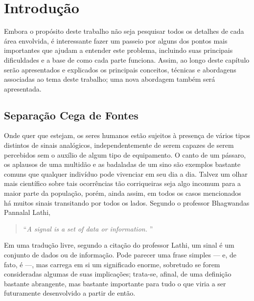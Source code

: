 \chapter{Introdução}
\label{cha:intro}

\setcounter{page}{1}



Embora o propósito deste trabalho não seja pesquisar todos os detalhes de cada área envolvida, é interessante fazer um passeio por alguns dos pontos mais importantes que ajudam a entender este problema, incluindo suas principais dificuldades e a base de como cada parte funciona. Assim, ao longo deste capítulo serão apresentados e explicados os principais conceitos, técnicas e abordagens associadas ao tema deste trabalho; uma nova abordagem também será apresentada.




\section{Separação Cega de Fontes}
\label{sec:intro_bss}

Onde quer que estejam, os seres humanos estão sujeitos à presença de vários tipos distintos de sinais analógicos, independentemente de serem capazes de serem percebidos sem o auxílio de algum tipo de equipamento. O canto de um pássaro, os aplausos de uma multidão e as badaladas de um sino são exemplos bastante comuns que qualquer indivíduo pode vivenciar em seu dia a dia. Talvez um olhar mais científico sobre tais ocorrências tão corriqueiras seja algo incomum para a maior parte da população, porém, ainda assim, em todos os casos mencionados há muitos sinais transitando por todos os lados. Segundo o professor Bhagwandas Pannalal Lathi,

\begin{formal}
\begin{quote}
\begin{flushright}
    \textcolor{citeblue}{\textquotedblleft \textit{A signal is a set of data or information.} \textquotedblright}\\ \citep{lathi2009linear}
\end{flushright}
\end{quote}
\end{formal}

Em uma tradução livre, segundo a citação do professor Lathi, um sinal é um conjunto de dados ou de informação. Pode parecer uma frase simples --- e, de fato, é ---, mas carrega em si um significado enorme, sobretudo se forem consideradas algumas de suas implicações; trata-se, afinal, de uma definição bastante abrangente, mas bastante importante para tudo o que viria a ser futuramente desenvolvido a partir de então.

